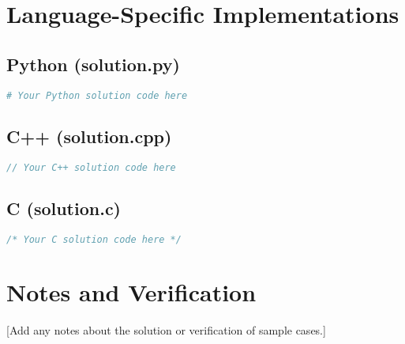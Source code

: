\documentclass[11pt,a4paper]{article}
\begin{document}
\section*{Language-Specific Implementations}

\subsection*{Python (solution.py)}
\begin{lstlisting}[language=Python]
# Your Python solution code here
\end{lstlisting}

\subsection*{C++ (solution.cpp)}
\begin{lstlisting}[language=C++]
// Your C++ solution code here
\end{lstlisting}

\subsection*{C (solution.c)}
\begin{lstlisting}[language=C]
/* Your C solution code here */
\end{lstlisting}

\section*{Notes and Verification}
[Add any notes about the solution or verification of sample cases.]
\end{document}
